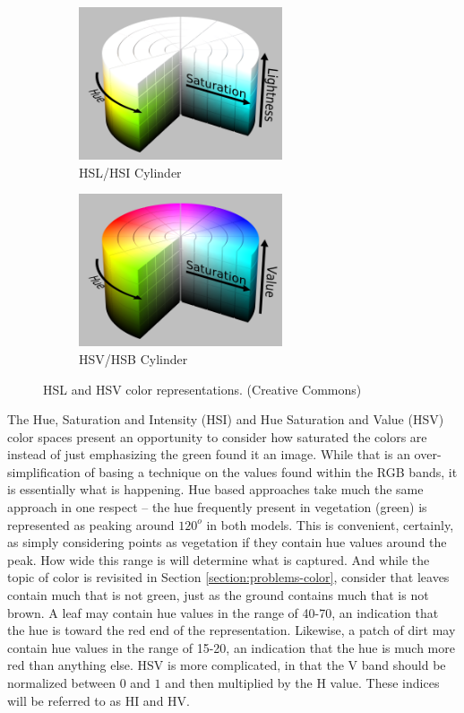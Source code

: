 \documentclass[letterpaper, notitlepage]{report}
\begin{document}
{\begin{figure}[H]
	\centering
	\begin{subfigure}[h]{.45\textwidth}
		\centering
		\includegraphics[width=6cm]{./figures/HSL_color_solid_cylinder_saturation_gray.png}
		\caption{HSL/HSI Cylinder}
		\label{fig:hsl}
	\end{subfigure}
	\hfill
	\begin{subfigure}[h]{.45\textwidth}
		\centering
		\includegraphics[width=6cm]{./figures/HSV_color_solid_cylinder_saturation_gray.png}
		\caption{HSV/HSB Cylinder}
		\label{fig:hsv}
	\end{subfigure}
	\caption[HSL and HSV color representations]{HSL and HSV color representations. (Creative Commons)}
	\label{fig:overlap}
\end{figure}



The Hue, Saturation and Intensity (HSI) and Hue Saturation and Value (HSV) color spaces present an opportunity to consider how saturated the colors are instead of just emphasizing the green found it an image. While that is  an over-simplification of basing a technique on the values found within the RGB bands, it is essentially what is happening. Hue based approaches take much the same approach in one respect -- the hue frequently present in vegetation (green) is represented as peaking around $120^o$ in both models. This is convenient, certainly, as simply considering points as vegetation if they contain hue values around the peak. How wide this range is will determine what is captured. And while the topic of color is revisited in Section \ref{section:problems-color}, consider that leaves contain much that is not green, just as the ground contains much that is not brown. A leaf may contain hue values in the range of 40-70, an indication that the hue is toward the red end of the representation. Likewise, a patch of dirt may contain hue values in the range of 15-20, an indication that the hue is much more red than anything else. HSV is  more complicated, in that the V band should be normalized between $0$ and $1$ and then multiplied by the H value. These indices will be referred to as HI and HV. 

}
\end{document}
